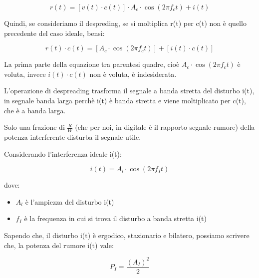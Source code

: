 {
    \Large 
    \begin{equation}
        r(t)
        =
        \left[v(t) \cdot c(t)\right]
        \cdot 
        A_c \cdot \cos(2 \pi f_c t) + i(t)
    \end{equation}
}

Quindi, se consideriamo il despreding, se si moltiplica r(t) per c(t) 
non è quello precedente del caso ideale, bensì: 

{
    \Large 
    \begin{equation}
            r(t) \cdot c(t)
            = 
            \left[A_c \cdot \cos(2 \pi f_c t) \right]
            + 
            \left[i(t) \cdot c(t)\right]
    \end{equation}
} 

La prima parte della equazione tra parentesi quadre, 
cioè $A_c \cdot \cos(2 \pi f_c t)$ è voluta, 
invece $i(t) \cdot c(t)$ non è voluta, è indesiderata. \newline 

L'operazione di despreading trasforma il segnale a banda stretta del disturbo i(t), 
in segnale banda larga perchè i(t) è banda stretta e viene moltiplicato per c(t), 
che è a banda larga. \newline 

Solo una frazione di $\frac{R}{W}$ (che per noi, in digitale è il rapporto segnale-rumore) 
della potenza interferente disturba il segnale utile. \newline 

Considerando l'interferenza ideale i(t): 

{
    \Large 
    \begin{equation}
        i(t)
        = 
        A_l \cdot \cos(2 \pi f_I t)
    \end{equation}
}

dove: 

\begin{itemize}
    \item $A_l$ è l'ampiezza del disturbo i(t)
    \item $f_I$ è la frequenza in cui si trova il disturbo a banda stretta i(t)
\end{itemize}

Sapendo che, il disturbo i(t) è ergodico, stazionario e bilatero, 
possiamo scrivere che, 
la potenza del rumore i(t) vale: 

{
    \Large 
    \begin{equation} 
        P_I 
        = 
        \frac{(A_I)^{2}}{2}    
    \end{equation}
}

